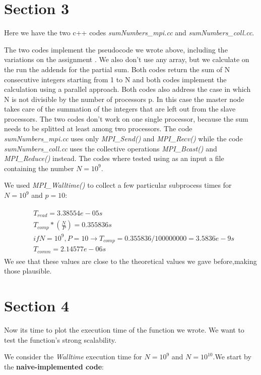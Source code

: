 \documentclass[11pt]{scrartcl} %
\begin{document}
\section{Section 3}
Here we have the two c++ codes \textit{sumNumbers\_mpi.cc} and \textit{sumNumbers\_coll.cc}.

The two codes implement the pseudocode we wrote above, including the variations on the assignment . We also don't use any array, but we calculate on the run the addends for the partial sum. Both codes return the sum of N consecutive integers starting from 1 to N and both codes implement the calculation using a parallel approach. Both codes also address the case in which N is not divisible by the number of processors p. In this case the master node takes care of the summation of the integers that are left out from the slave processors. The two codes don't work on one single processor, because the sum needs to be splitted at least among two processors.
The code \textit{sumNumbers\_mpi.cc} uses only \textit{MPI\_Send()} and \textit{MPI\_Recv()}
while the code \textit{sumNumbers\_coll.cc} uses the collective operations \textit{MPI\_Bcast()} and \textit{MPI\_Reduce()} instead. The codes where tested using as an input a file containing the number $N = 10^9$.

We used \textit{MPI\_Walltime()} to collect a few particular subprocess times for $N=10^9$ and $p=10$:

\begin{align} 
	\begin{split}
		&T_{read}= 3.38554 e-05 s\\
		&T_{comp}*(\frac{N}{P})= 0.355836 s\\
		&if N=10^9, P=10\rightarrow T_{comp} = 0.355836/100000000 = 3.5836e-9 s\\
		&T_{comm}=2.14577e-06 s
	\end{split}					
\end{align}
 We see that these values are close to the theoretical values we gave before,making those plausible.

\section{Section 4}
Now its time to plot the execution time of the function we wrote. We want to test the function's strong scalability.

We consider the \textit{Walltime} execution time for $N=10^9$ and $N=10^{10}$.We start by the \textbf{naive-implemented code}:
\end{document}

